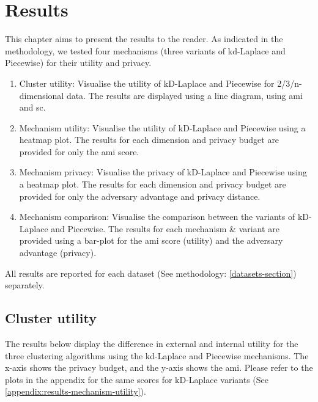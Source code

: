 \chapter{Results}
This chapter aims to present the results to the reader.
As indicated in the methodology, we tested four mechanisms (three variants of kd-Laplace and Piecewise) for their utility and privacy.
\begin{enumerate}
  \item Cluster utility: Visualise the utility of kD-Laplace and Piecewise for 2/3/n-dimensional data.
        The results are displayed using a line diagram, using \gls{ami} and \gls{sc}.
  \item Mechanism utility: Visualise the utility of kD-Laplace and Piecewise using a heatmap plot.
        The results for each dimension and privacy budget are provided for only the \gls{ami} score.
  \item Mechanism privacy: Visualise the privacy of kD-Laplace and Piecewise using a heatmap plot.
        The results for each dimension and privacy budget are provided for only the adversary advantage and privacy distance.
  \item Mechanism comparison: Visualise the comparison between the variants of kD-Laplace and Piecewise.
        The results for each mechanism \& variant are provided using a bar-plot for the \gls{ami} score (utility) and the adversary advantage (privacy).
\end{enumerate}
All results are reported for each dataset (See methodology: \ref{datasets-section}) separately.
\section{Cluster utility}
The results below display the difference in external and internal utility for the three clustering algorithms using the kd-Laplace and Piecewise mechanisms.
The x-axis shows the privacy budget, and the y-axis shows the \gls{ami}.
Please refer to the plots in the appendix for the same scores for kD-Laplace variants (See \ref{appendix:results-mechanism-utility}).
\newpage
